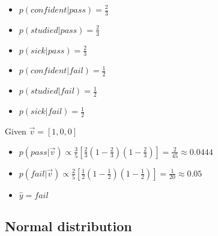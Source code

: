 \documentclass[xcolor=table]{beamer}
\begin{document}
\begin{frame}
	\begin{minipage}{0.12\textwidth}\small
		\hfill
	\end{minipage}
	\begin{minipage}{0.43\textwidth}\small
		\begin{itemize}
			\item $p(confident|pass) = \frac{2}{3}$
			\item $p(studied|pass) = \frac{2}{3}$
			\item $p(sick|pass) = \frac{2}{3}$
		\end{itemize}
	\end{minipage}
	\begin{minipage}{0.43\textwidth}\small
		\begin{itemize}
			\item $p(confident|fail) = \frac{1}{2}$
			\item $p(studied|fail) = \frac{1}{2}$
			\item $p(sick|fail) = \frac{1}{2}$
		\end{itemize}
	\end{minipage}

	\vfill
	Given $ \vec{v} = [1, 0, 0]$
	\begin{itemize}
		\item $p(pass|\vec{v}) \propto \frac{3}{5} [\frac{2}{3} (1-\frac{2}{3}) (1-\frac{2}{3})]  = \frac{2}{45} \approx 0.0444$
		\item $p(fail|\vec{v}) \propto \frac{2}{5} [\frac{1}{2} (1-\frac{1}{2}) (1-\frac{1}{2})]  = \frac{1}{20} \approx 0.05$
		\item $ \hat{y} = fail $
	\end{itemize}
	
	
\end{frame}


\subsection{Normal distribution}
\end{document}
